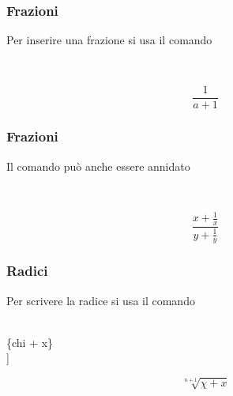 \documentclass[svgnames,%
	ucs,%
	pdftex]{guitbeamer}
\begin{document}
\begin{frame}
  \frametitle{Frazioni}
	Per inserire una frazione si usa il comando 
	\begin{LaTeXcode}
		\\[\n
    \hspace*{5ex}\alert{\\frac\{1\}\{a+1\}}\n
		\\]
	\end{LaTeXcode}
	\begin{LaTeXoutput}
		\[
			\frac{1}{a+1}
		\]
	\end{LaTeXoutput}
\end{frame}
\begin{frame}
  \frametitle{Frazioni}
	Il comando  pu\`o anche essere annidato
	\begin{LaTeXcode}
		\\[\n
    \alert{\\frac}\{x+\alert{\\frac\{1\}\{x\}}\}\{y+\alert{\\frac\{1\}\{y\}}\}\n
		\\]
	\end{LaTeXcode}
	\begin{LaTeXoutput}
		\[
			\frac{x+\frac{1}{x}}{y+\frac{1}{y}}
		\]
	\end{LaTeXoutput}
\end{frame}
\begin{frame}
  \frametitle{Radici}
	Per scrivere la radice si usa il comando 
 	\begin{LaTeXcode}
		\\[\n
		\hspace*{5ex}\alert{\\sqrt}[n+1]\{\bs chi + x\}\n
		\\]
 	\end{LaTeXcode}
	\begin{LaTeXoutput}
		\[
			\sqrt[n+1]{\chi + x}
		\]
	\end{LaTeXoutput}
\end{frame}
\end{document}
